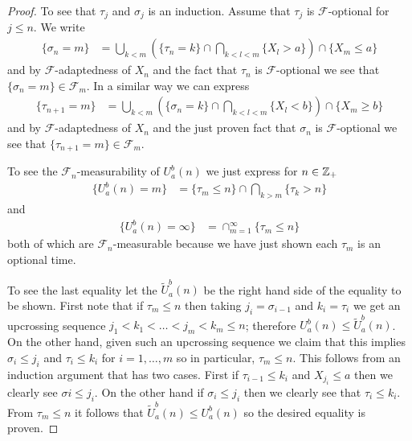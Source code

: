 \begin{proof}
To see that $\tau_j$ and $\sigma_j$ is an induction.  Assume that
$\tau_j$ is $\mathcal{F}$-optional for $j \leq n$.  We write
\begin{align*}
\lbrace \sigma_n = m \rbrace &= \bigcup_{k<m}
\left ( \lbrace \tau_n = k \rbrace
\cap \bigcap_{k < l < m} \lbrace X_l > a\rbrace\right) \cap \lbrace X_m \leq a\rbrace
\end{align*}
and by $\mathcal{F}$-adaptedness of $X_n$ and the fact
that $\tau_n$ is $\mathcal{F}$-optional we see that $\lbrace
\sigma_n = m \rbrace \in \mathcal{F}_m$.  In a similar way we can
express
\begin{align*}
\lbrace \tau_{n+1} = m \rbrace &= \bigcup_{k < m} \left ( \lbrace \sigma_n = k \rbrace
\cap \bigcap_{k < l < m} \lbrace X_l < b \rbrace\right) \cap \lbrace
X_m \geq b \rbrace
\end{align*}
and by $\mathcal{F}$-adaptedness of $X_n$ and the just
proven fact
that $\sigma_n$ is $\mathcal{F}$-optional we see that $\lbrace
\tau_{n+1} = m \rbrace \in \mathcal{F}_m$.

To see the $\mathcal{F}_n$-measurability of $U_a^b(n)$ we just express for $n \in \mathbb{Z}_+$
\begin{align*}
\lbrace U_a^b(n) = m \rbrace &= \lbrace \tau_m \leq n \rbrace \cap
\bigcap_{k >m} \lbrace \tau_k > n\rbrace
\end{align*}
and 
\begin{align*}
\lbrace U_a^b(n) = \infty \rbrace &= \cap_{m=1}^\infty \lbrace \tau_m \leq n\rbrace 
\end{align*}
both of which are $\mathcal{F}_n$-measurable because we have just shown each $\tau_m$ is an
optional time.

To see the last equality let the $\tilde{U}_a^b(n)$ be the right hand
side of the equality to be shown.  First note that if $\tau_m \leq n$ then
taking $j_i = \sigma_{i-1}$ and $k_i = \tau_i$ we get an upcrossing sequence $j_1 <
k_1 < \dotsc < j_m < k_m \leq n$; therefore $U_a^b(n) \leq
\tilde{U}_a^b(n)$.  
On the other hand, given such an upcrossing sequence we claim that
this implies $\sigma_i \leq j_i$ and $\tau_i \leq k_i$ for $i=1,\dotsc,m$ so in
particular, $\tau_m \leq n$.  This follows from an induction argument
that has two cases.  First if
$\tau_{i-1} \leq k_i$ and $X_{j_i} \leq a$ then we clearly see
$\sigma{i} \leq j_i$.  On the other hand if $\sigma_i \leq j_i$ then
we clearly see that $\tau_i \leq k_i$.  From $\tau_m \leq n$ it follows that
$\tilde{U}_a^b(n) \leq U_a^b(n)$ so the desired equality is proven.
\end{proof}

